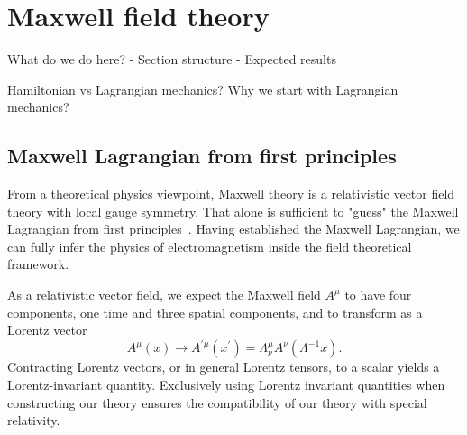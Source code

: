 \section{Maxwell field theory}

What do we do here?
- Section structure
- Expected results

Hamiltonian vs Lagrangian mechanics?
Why we start with Lagrangian mechanics?


\subsection{Maxwell Lagrangian from first principles}


From a theoretical physics viewpoint, Maxwell theory is a relativistic vector field theory with local gauge symmetry.
That alone is sufficient to "guess" the Maxwell Lagrangian from first principles~\cite[p.~149]{Greiner2013}.
Having established the Maxwell Lagrangian, we can fully infer the physics of electromagnetism inside the field theoretical framework.

As a relativistic vector field, we expect the Maxwell field $A^\mu$ to have four components, one time and three spatial components, and to transform as a Lorentz vector~\cite[p.~37]{Peskin1995}
\begin{equation}
	A^\mu(x)
	\to
	A^{\prime\mu}(x^\prime)
	=
	\Lambda^\mu_\nu
	A^\nu(\Lambda^{-1}x)
	.
\end{equation}
Contracting Lorentz vectors, or in general Lorentz tensors, to a scalar yields a Lorentz-invariant quantity.
Exclusively using Lorentz invariant quantities when constructing our theory ensures the compatibility of our theory with special relativity.

